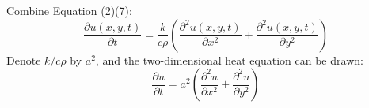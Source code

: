 \documentclass[11pt]{article}
\begin{document}
Combine Equation (2)(7):
\begin{equation}
\frac{\partial u(x,y,t)}{\partial t}=\frac{k}{c\rho}(\frac{\partial ^2 u(x,y,t)}{\partial x^2}+\frac{\partial ^2 u(x,y,t)}{\partial y^2})
\end{equation}
Denote $k/c\rho$ by $a^2$, and the two-dimensional heat equation can be drawn:
\begin{equation}
\frac{\partial u}{\partial t}=a^2\left(\frac{\partial ^2 u}{\partial x^2}+\frac{\partial ^2 u}{\partial y^2}\right)
\end{equation}
\end{document}
